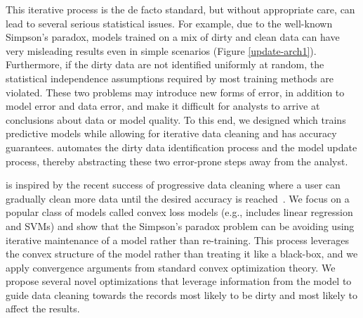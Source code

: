This iterative process is the de facto standard, but without appropriate care, can lead to several serious statistical issues.
For example, due to the well-known Simpson's paradox, models trained on a mix of dirty and clean data can have very misleading results even in simple scenarios (Figure \ref{update-arch1}).
Furthermore, if the dirty data are not identified uniformly at random, the statistical independence assumptions required by most training methods are violated. 
These two problems may introduce new forms of error, in addition to model error and data error, and make it difficult for analysts to arrive at conclusions about data or model quality.
To this end, we designed \sys which trains predictive models while allowing for iterative data cleaning and has accuracy guarantees.
\sys automates the dirty data identification process and the model update process, thereby abstracting these two error-prone steps away from the analyst.

\sys is inspired by the recent success of progressive data cleaning where a user can gradually clean more data until the desired accuracy is reached~\cite{altowim2014progressive, whang2014incremental, papenbrock2015progressive, gruenheid2014incremental, mayfield2010eracer, DBLP:journals/pvldb/YakoutENOI11, yakout2013don}.
We focus on a popular class of models called convex loss models (e.g., includes linear regression and SVMs) and show that the Simpson's paradox problem can be avoiding using iterative maintenance of a model rather than re-training.
This process leverages the convex structure of the model rather than treating it like a black-box, and we apply convergence arguments from standard convex optimization theory.
We propose several novel optimizations that leverage information from the model to guide data cleaning towards the records most likely to be dirty and most likely to affect the results.










